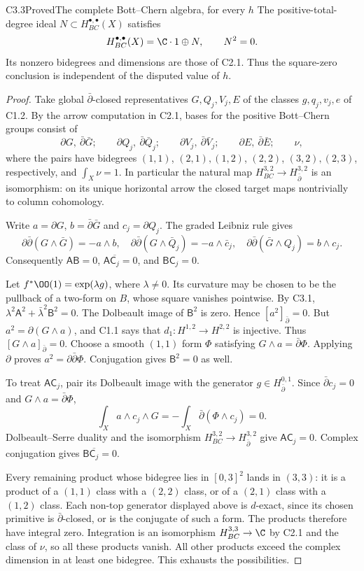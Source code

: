 \begin{claim}{C3.3}{Proved}{The complete Bott--Chern algebra, for every $h$}
The positive-total-degree ideal $N\subset H^{\bullet,\bullet}_{BC}(X)$
satisfies
\[
H^{\bullet,\bullet}_{BC}(X)=\C\cdot1\oplus N,\qquad N^2=0.
\]
Its nonzero bidegrees and dimensions are those of C2.1.  Thus the
square-zero conclusion is independent of the disputed value of $h$.
\end{claim}
\begin{proof}
Take global $\bar\partial$-closed representatives $G,Q_j,V_j,E$
of the classes $g,q_j,v_j,e$ of C1.2.  By the arrow computation in
C2.1, bases for the positive Bott--Chern groups consist of
\[
\partial G,\ \bar\partial\bar G;\qquad
\partial Q_j,\ \bar\partial\bar Q_j;\qquad
\partial V_j,\ \bar\partial\bar V_j;\qquad
\partial E,\ \bar\partial\bar E;\qquad \nu,
\]
where the pairs have bidegrees $(1,1)$, $(2,1),(1,2)$,
$(2,2)$, $(3,2),(2,3)$, respectively, and
$\int_X\nu=1$.  In particular the natural map
$H^{3,2}_{BC}\to H^{3,2}_{\bar\partial}$ is an isomorphism:
on its unique horizontal arrow the closed target maps nontrivially
to column cohomology.

Write $a=\partial G$, $b=\bar\partial\bar G$ and
$c_j=\partial Q_j$.  The graded Leibniz rule gives
\[
\partial\bar\partial(G\wedge\bar G)=-a\wedge b,
\quad
\partial\bar\partial(G\wedge\bar Q_j)
=-a\wedge\bar c_j,
\quad
\partial\bar\partial(\bar G\wedge Q_j)=b\wedge c_j.
\]
Consequently $\mathsf A\mathsf B=0$,
$\mathsf A\overline{\mathsf C_j}=0$, and
$\mathsf B\mathsf C_j=0$.

Let $f^*\OO(1)=\exp(\lambda g)$, where $\lambda\ne0$.
Its curvature may be chosen to be the pullback of a two-form on $B$,
whose square vanishes pointwise.  By C3.1,
$\lambda^2\mathsf A^2+\bar\lambda^2\mathsf B^2=0$.
The Dolbeault image of $\mathsf B^2$ is zero.  Hence
$[a^2]_{\bar\partial}=0$.  But
$a^2=\partial(G\wedge a)$, and C1.1 says that
$d_1:H^{1,2}\to H^{2,2}$ is injective.  Thus
$[G\wedge a]_{\bar\partial}=0$.  Choose a smooth $(1,1)$ form
$\Phi$ satisfying $G\wedge a=\bar\partial\Phi$.  Applying
$\partial$ proves $a^2=\partial\bar\partial\Phi$.
Conjugation gives $\mathsf B^2=0$ as well.

To treat $\mathsf A\mathsf C_j$, pair its Dolbeault image with the
generator $g\in H^{0,1}_{\bar\partial}$.  Since
$\bar\partial c_j=0$ and $G\wedge a=\bar\partial\Phi$,
\[
\int_X a\wedge c_j\wedge G
=-\int_X\bar\partial(\Phi\wedge c_j)=0.
\]
Dolbeault--Serre duality and the isomorphism
$H^{3,2}_{BC}\to H^{3,2}_{\bar\partial}$ give
$\mathsf A\mathsf C_j=0$.  Complex conjugation gives
$\mathsf B\overline{\mathsf C_j}=0$.

Every remaining product whose bidegree lies in $[0,3]^2$ lands in
$(3,3)$: it is a product of a $(1,1)$ class with a $(2,2)$ class,
or of a $(2,1)$ class with a $(1,2)$ class.  Each non-top generator
displayed above is $d$-exact, since its chosen primitive is
$\bar\partial$-closed, or is the conjugate of such a form.
The products therefore have integral zero.  Integration is an
isomorphism $H^{3,3}_{BC}\to\C$ by C2.1 and the class of $\nu$,
so all these products vanish.  All other products exceed the complex
dimension in at least one bidegree.  This exhausts the possibilities.
\end{proof}
